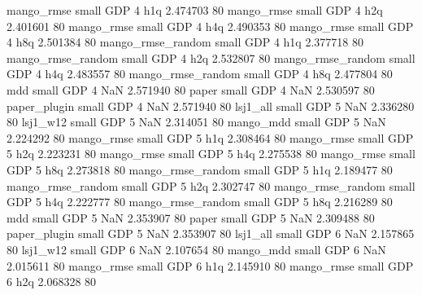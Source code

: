        mango_rmse      small      GDP                 4                  h1q 2.474703 80
       mango_rmse      small      GDP                 4                  h2q 2.401601 80
       mango_rmse      small      GDP                 4                  h4q 2.490353 80
       mango_rmse      small      GDP                 4                  h8q 2.501384 80
mango_rmse_random      small      GDP                 4                  h1q 2.377718 80
mango_rmse_random      small      GDP                 4                  h2q 2.532807 80
mango_rmse_random      small      GDP                 4                  h4q 2.483557 80
mango_rmse_random      small      GDP                 4                  h8q 2.477804 80
              mdd      small      GDP                 4                  NaN 2.571940 80
            paper      small      GDP                 4                  NaN 2.530597 80
     paper_plugin      small      GDP                 4                  NaN 2.571940 80
         lsj1_all      small      GDP                 5                  NaN 2.336280 80
         lsj1_w12      small      GDP                 5                  NaN 2.314051 80
        mango_mdd      small      GDP                 5                  NaN 2.224292 80
       mango_rmse      small      GDP                 5                  h1q 2.308464 80
       mango_rmse      small      GDP                 5                  h2q 2.223231 80
       mango_rmse      small      GDP                 5                  h4q 2.275538 80
       mango_rmse      small      GDP                 5                  h8q 2.273818 80
mango_rmse_random      small      GDP                 5                  h1q 2.189477 80
mango_rmse_random      small      GDP                 5                  h2q 2.302747 80
mango_rmse_random      small      GDP                 5                  h4q 2.222777 80
mango_rmse_random      small      GDP                 5                  h8q 2.216289 80
              mdd      small      GDP                 5                  NaN 2.353907 80
            paper      small      GDP                 5                  NaN 2.309488 80
     paper_plugin      small      GDP                 5                  NaN 2.353907 80
         lsj1_all      small      GDP                 6                  NaN 2.157865 80
         lsj1_w12      small      GDP                 6                  NaN 2.107654 80
        mango_mdd      small      GDP                 6                  NaN 2.015611 80
       mango_rmse      small      GDP                 6                  h1q 2.145910 80
       mango_rmse      small      GDP                 6                  h2q 2.068328 80
